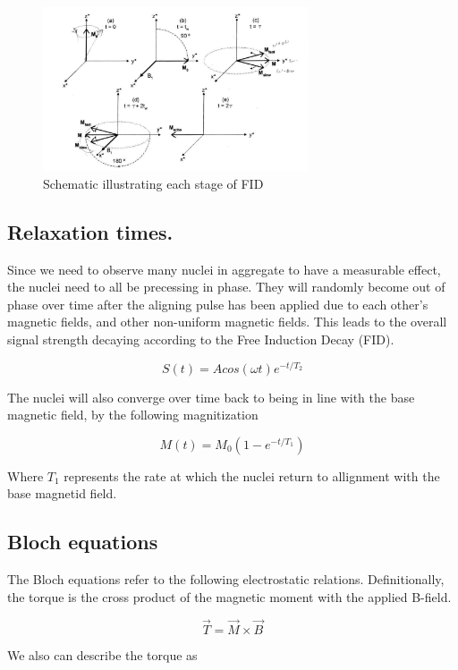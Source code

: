 \documentclass[12pt]{article}
\begin{document}
\begin{figure}[h!]
  \centering
  \includegraphics[width=0.7\textwidth]{FID.png}
  \caption{Schematic illustrating each stage of FID \cite{pulsed_spectrometer_manual}}
  \label{fig:example}
\end{figure}



\subsection {Relaxation times.}

Since we need to observe many nuclei in aggregate to have a measurable effect, the nuclei need to all be precessing in phase. They will randomly become out of phase over time after the aligning pulse has been applied due to each other's magnetic fields, and other non-uniform magnetic fields. This leads to the overall signal strength decaying according to the Free Induction Decay (FID).

\[S(t) = Acos(\omega t)e^{-t/T_2}\]

The nuclei will also converge over time back to being in line with the base magnetic field, by the following magnitization

\[M(t) = M_0(1-e^{-t/T_1})\]

Where $T_1$ represents the rate at which the nuclei return to allignment with the base magnetid field.


\subsection{Bloch equations}

The Bloch equations refer to the following electrostatic relations. Definitionally, the torque is the cross product of the magnetic moment with the applied B-field.

\[\vec{T} = \vec{M} \times \vec{B}\]

We also can describe the torque as
\end{document}
